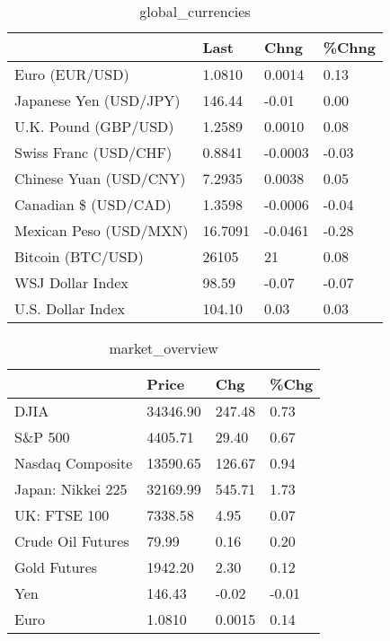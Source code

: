 \documentclass{article}%
\begin{document}
%


\begin{table}[htbp]%
\caption{global\_currencies}%
\centering%
\begin{adjustbox}{width=1\textwidth}%
\begin{tabular}{llll}
\toprule
                       &    Last &    Chng & \%Chng \\
\midrule
        Euro (EUR/USD) &  1.0810 &  0.0014 &  0.13 \\
Japanese Yen (USD/JPY) &  146.44 &   -0.01 &  0.00 \\
  U.K. Pound (GBP/USD) &  1.2589 &  0.0010 &  0.08 \\
 Swiss Franc (USD/CHF) &  0.8841 & -0.0003 & -0.03 \\
Chinese Yuan (USD/CNY) &  7.2935 &  0.0038 &  0.05 \\
  Canadian \$ (USD/CAD) &  1.3598 & -0.0006 & -0.04 \\
Mexican Peso (USD/MXN) & 16.7091 & -0.0461 & -0.28 \\
     Bitcoin (BTC/USD) &   26105 &      21 &  0.08 \\
      WSJ Dollar Index &   98.59 &   -0.07 & -0.07 \\
     U.S. Dollar Index &  104.10 &    0.03 &  0.03 \\
\bottomrule
\end{tabular}
%
\end{adjustbox}%
\end{table}

%


\begin{table}[htbp]%
\caption{market\_overview}%
\centering%
\begin{adjustbox}{width=1\textwidth}%
\begin{tabular}{llll}
\toprule
                  &    Price &    Chg &  \%Chg \\
\midrule
             DJIA & 34346.90 & 247.48 &  0.73 \\
          S\&P 500 &  4405.71 &  29.40 &  0.67 \\
 Nasdaq Composite & 13590.65 & 126.67 &  0.94 \\
Japan: Nikkei 225 & 32169.99 & 545.71 &  1.73 \\
     UK: FTSE 100 &  7338.58 &   4.95 &  0.07 \\
Crude Oil Futures &    79.99 &   0.16 &  0.20 \\
     Gold Futures &  1942.20 &   2.30 &  0.12 \\
              Yen &   146.43 &  -0.02 & -0.01 \\
             Euro &   1.0810 & 0.0015 &  0.14 \\
\bottomrule
\end{tabular}
%
\end{adjustbox}%
\end{table}

%
\end{document}
